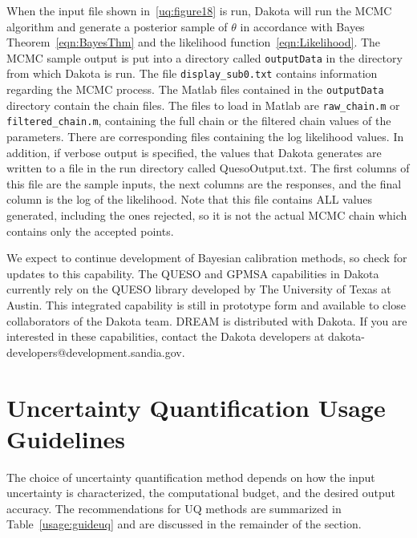 When the input file shown in~\ref{uq:figure18} is run, 
Dakota will run the MCMC algorithm and generate a posterior sample of 
$\theta$ in accordance with Bayes Theorem~\ref{eqn:BayesThm} and 
the likelihood function~\ref{eqn:Likelihood}. The MCMC sample output 
is put into a directory called \texttt{outputData} in the directory 
from which Dakota is run.  The file \texttt{display\_sub0.txt} 
contains information regarding the MCMC process.  The 
Matlab files contained in the \texttt{outputData} directory
contain the chain files.  The files to load in Matlab are 
\texttt{raw\_chain.m} or \texttt{filtered\_chain.m}, containing 
the full chain or the filtered chain values of the parameters. 
There are corresponding files containing the log likelihood values. 
In addition, if verbose output is specified, 
the values that Dakota generates are 
written to a file in the run directory called QuesoOutput.txt. 
The first columns of this file are the sample inputs, the next columns 
are the responses, and the final column is the log of the 
likelihood.  Note that this file contains ALL values generated, 
including the ones rejected, so it is not the actual MCMC
chain which contains only the accepted points.

We expect to continue development of Bayesian calibration methods, 
so check for updates to this capability. The QUESO and GPMSA capabilities
in Dakota currently rely on the QUESO library developed by The University of 
Texas at Austin. This integrated capability is still in prototype form and 
available to close collaborators of the Dakota team.  DREAM is distributed 
with Dakota.
If you are interested in these capabilities, contact the Dakota developers at  
dakota-developers@development.sandia.gov.
  
\section{Uncertainty Quantification Usage Guidelines }\label{usage:uq}

The choice of uncertainty quantification method depends on how the
input uncertainty is characterized, the computational budget, and the
desired output accuracy.  The recommendations for UQ methods are
summarized in Table~\ref{usage:guideuq} and are discussed in the
remainder of the section.

